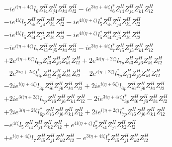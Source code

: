  \begin{align} 
 & -i e^{i \Big(\eta +4 \zeta \Big)} l_6 Z_{{i 4}}^{H} Z_{{j 4}}^{H} Z_{{k 1}}^{H} Z_{{l 2}}^{H} -i e^{3 i \eta +4 i \zeta } l_6^* Z_{{i 4}}^{H} Z_{{j 4}}^{H} Z_{{k 1}}^{H} Z_{{l 2}}^{H} \nonumber \\ 
 &-i e^{4 i \zeta } l_5 Z_{{i 5}}^{H} Z_{{j 4}}^{H} Z_{{k 1}}^{H} Z_{{l 2}}^{H} -i e^{4 i \Big(\eta +\zeta \Big)} l_5^* Z_{{i 5}}^{H} Z_{{j 4}}^{H} Z_{{k 1}}^{H} Z_{{l 2}}^{H} \nonumber \\ 
 &-i e^{4 i \zeta } l_5 Z_{{i 4}}^{H} Z_{{j 5}}^{H} Z_{{k 1}}^{H} Z_{{l 2}}^{H} -i e^{4 i \Big(\eta +\zeta \Big)} l_5^* Z_{{i 4}}^{H} Z_{{j 5}}^{H} Z_{{k 1}}^{H} Z_{{l 2}}^{H} \nonumber \\ 
 &-i e^{i \Big(\eta +4 \zeta \Big)} l_7 Z_{{i 5}}^{H} Z_{{j 5}}^{H} Z_{{k 1}}^{H} Z_{{l 2}}^{H} -i e^{3 i \eta +4 i \zeta } l_7^* Z_{{i 5}}^{H} Z_{{j 5}}^{H} Z_{{k 1}}^{H} Z_{{l 2}}^{H} \nonumber \\ 
 &+2 e^{i \Big(\eta +6 \zeta \Big)} l_{6p} Z_{{i 3}}^{H} Z_{{j 6}}^{H} Z_{{k 1}}^{H} Z_{{l 2}}^{H} +2 e^{3 i \Big(\eta +2 \zeta \Big)} l_{7p} Z_{{i 3}}^{H} Z_{{j 6}}^{H} Z_{{k 1}}^{H} Z_{{l 2}}^{H} \nonumber \\ 
 &-2 e^{3 i \eta +2 i \zeta } l_{6p}^* Z_{{i 3}}^{H} Z_{{j 6}}^{H} Z_{{k 1}}^{H} Z_{{l 2}}^{H} -2 e^{i \Big(\eta +2 \zeta \Big)} l_{7p}^* Z_{{i 3}}^{H} Z_{{j 6}}^{H} Z_{{k 1}}^{H} Z_{{l 2}}^{H} \nonumber \\ 
 &-2 i e^{i \Big(\eta +4 \zeta \Big)} l_{3p} Z_{{i 6}}^{H} Z_{{j 6}}^{H} Z_{{k 1}}^{H} Z_{{l 2}}^{H} +2 i e^{i \Big(\eta +6 \zeta \Big)} l_{6p} Z_{{i 6}}^{H} Z_{{j 6}}^{H} Z_{{k 1}}^{H} Z_{{l 2}}^{H} \nonumber \\ 
 &+2 i e^{3 i \Big(\eta +2 \zeta \Big)} l_{7p} Z_{{i 6}}^{H} Z_{{j 6}}^{H} Z_{{k 1}}^{H} Z_{{l 2}}^{H} -2 i e^{3 i \eta +4 i \zeta } l_{3p}^* Z_{{i 6}}^{H} Z_{{j 6}}^{H} Z_{{k 1}}^{H} Z_{{l 2}}^{H} \nonumber \\ 
 &+2 i e^{3 i \eta +2 i \zeta } l_{6p}^* Z_{{i 6}}^{H} Z_{{j 6}}^{H} Z_{{k 1}}^{H} Z_{{l 2}}^{H} +2 i e^{i \Big(\eta +2 \zeta \Big)} l_{7p}^* Z_{{i 6}}^{H} Z_{{j 6}}^{H} Z_{{k 1}}^{H} Z_{{l 2}}^{H} \nonumber \\ 
 &- e^{4 i \zeta } l_5 Z_{{i 4}}^{H} Z_{{j 1}}^{H} Z_{{k 2}}^{H} Z_{{l 2}}^{H} +e^{4 i \Big(\eta +\zeta \Big)} l_5^* Z_{{i 4}}^{H} Z_{{j 1}}^{H} Z_{{k 2}}^{H} Z_{{l 2}}^{H} \nonumber \\ 
 &+e^{i \Big(\eta +4 \zeta \Big)} l_7 Z_{{i 5}}^{H} Z_{{j 1}}^{H} Z_{{k 2}}^{H} Z_{{l 2}}^{H} - e^{3 i \eta +4 i \zeta } l_7^* Z_{{i 5}}^{H} Z_{{j 1}}^{H} Z_{{k 2}}^{H} Z_{{l 2}}^{H} \nonumber \\ 

\end{align}
